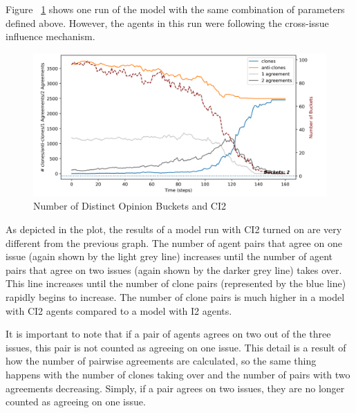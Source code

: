 Figure ~\ref{H3a_census_CI2} shows one run of the model with the same combination of parameters defined above. However, the agents in this run were following the cross-issue influence mechanism. 

\begin{figure}
\centering
\includegraphics[width=1.0\columnwidth]{./Graphs/census3CI2.png}
\caption{Number of Distinct Opinion Buckets and CI2}
\label{H3a_census_CI2}
\end{figure}

As depicted in the plot, the results of a model run with CI2 turned on are very different from the previous graph. The number of agent pairs that agree on one issue (again shown by the light grey line) increases until the number of agent pairs that agree on two issues (again shown by the darker grey line) takes over. This line increases until the number of clone pairs (represented by the blue line) rapidly begins to increase. The number of clone pairs is much higher in a model with CI2 agents compared to a model with I2 agents.  

It is important to note that if a pair of agents agrees on two out of the three issues, this pair is not counted as agreeing on one issue. This detail is a result of how the number of pairwise agreements are calculated, so the same thing happens with the number of clones taking over and the number of pairs with two agreements decreasing. Simply, if a pair agrees on two issues, they are no longer counted as agreeing on one issue.

